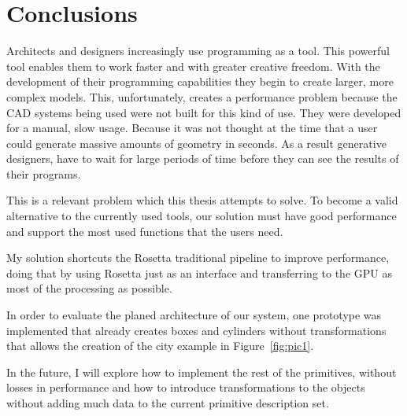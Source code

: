 
% 
% 

\section{Conclusions}
\label{sec:conclusions}

Architects and designers increasingly use programming as a tool. This powerful tool enables them to work faster and with greater creative freedom. With the development of their programming capabilities they begin to create larger, more complex models. This, unfortunately, creates a performance problem because the CAD systems being used were not built for this kind of use. They were developed for a manual, slow usage. Because it was not thought at the time that a user could generate massive amounts of geometry in seconds. As a result generative designers, have to wait for large periods of time before they can see the results of their programs.

This is a relevant problem which this thesis attempts to solve.
To become a valid alternative to the currently used tools, our solution must have good performance and support the most used functions that the users need.

My solution shortcuts the Rosetta traditional pipeline to improve performance, doing that by using Rosetta just as an interface and transferring to the GPU as most of the processing as possible.

In order to evaluate the planed architecture of our system, one prototype was implemented that already creates boxes and cylinders without transformations that allows the creation of the city example in Figure~\ref{fig:pic1}.

In the future, I will explore how to implement the rest of the primitives, without losses in performance and how to introduce transformations to the objects without adding much data to the current primitive description set.
